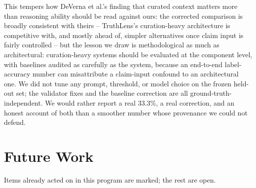 \documentclass[conference]{IEEEtran}
\begin{document}
This tempers how DeVerna et al.'s finding
\cite{deverna2025curatedcontext} that curated context matters more than
reasoning ability should be read against ours: the corrected comparison
is broadly consistent with theirs -- TruthLens's curation-heavy
architecture is competitive with, and mostly ahead of, simpler
alternatives once claim input is fairly controlled -- but the lesson we
draw is methodological as much as architectural: curation-heavy systems
should be evaluated at the component level, with baselines audited as
carefully as the system, because an end-to-end label-accuracy number can
misattribute a claim-input confound to an architectural one. We did not
tune any prompt, threshold, or model choice on the frozen held-out set;
the validator fixes and the baseline correction are all
ground-truth-independent. We would rather report a real 33.3\%, a real
correction, and an honest account of both than a smoother number whose
provenance we could not defend.

\section{Future Work}
\label{sec:futurework}

Items already acted on in this program are marked; the rest are open.
\end{document}
